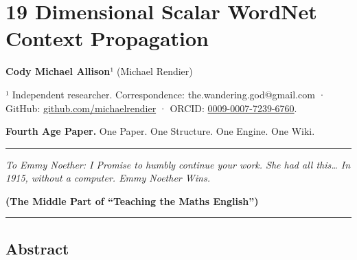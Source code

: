 \documentclass[
  10pt,
]{article}
\author{}
\date{}
\begin{document}
{
\hypersetup{linkcolor=}
\setcounter{tocdepth}{3}
\tableofcontents
}
\hypertarget{dimensional-scalar-wordnet-context-propagation}{%
\section{19 Dimensional Scalar WordNet Context
Propagation}\label{dimensional-scalar-wordnet-context-propagation}}

\textbf{Cody Michael Allison}¹ (Michael Rendier)

¹ Independent researcher. Correspondence: the.wandering.god@gmail.com ·
GitHub:
\href{https://github.com/michaelrendier}{github.com/michaelrendier} ·
ORCID:
\href{https://orcid.org/0009-0007-7239-6760}{0009-0007-7239-6760}.

\textbf{Fourth Age Paper.} One Paper. One Structure. One Engine. One
Wiki.

\begin{center}\rule{0.5\linewidth}{0.5pt}\end{center}

\emph{To Emmy Noether: I Promise to humbly continue your work. She had
all this\ldots{} In 1915, without a computer. Emmy Noether Wins.}

\textbf{(The Middle Part of ``Teaching the Maths English'')}

\begin{center}\rule{0.5\linewidth}{0.5pt}\end{center}

\hypertarget{abstract}{%
\subsection{Abstract}\label{abstract}}
\end{document}
